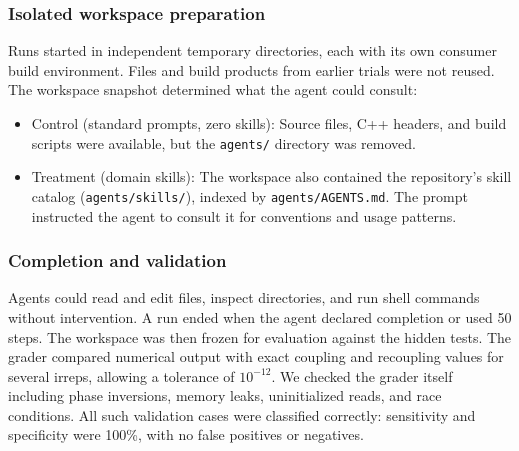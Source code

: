 \documentclass[aps,onecolumn,10pt,superscriptaddress,floatfix,nofootinbib]{revtex4}
\begin{document}
\subsubsection{Isolated workspace preparation}
Runs started in independent temporary directories, each with its own consumer build environment.
Files and build products from earlier trials were not reused. The workspace
snapshot determined what the agent could consult:
\begin{itemize}
    \item {Control (standard prompts, zero skills):} Source files, C++
    headers, and build scripts were available, but the \verb|agents/| directory was removed.
    \item {Treatment (domain skills):} The workspace also contained the
    repository's skill catalog (\verb|agents/skills/|), indexed by
    \verb|agents/AGENTS.md|. The prompt instructed the agent to consult it
    for conventions and usage patterns.
\end{itemize}

\subsubsection{Completion and validation}
Agents could read and edit files, inspect directories, and run shell commands
without intervention. A run ended when the agent declared completion or used
50 steps. The workspace was then frozen for evaluation against the hidden
tests. %
The grader compared numerical output with exact coupling and
recoupling values for several irreps, allowing a tolerance of $10^{-12}$.
We checked the grader itself 
including phase inversions, memory leaks, uninitialized reads, and race conditions. All such
validation cases were classified correctly: sensitivity and specificity were
100\%, with no false positives or negatives.
\end{document}
